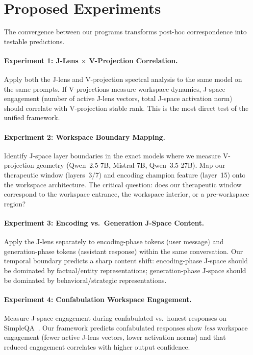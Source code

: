 \documentclass[11pt,a4paper]{article}
\begin{document}
\section{Proposed Experiments}
\label{sec:experiments}

The convergence between our programs transforms post-hoc correspondence
into testable predictions.

\paragraph{Experiment 1: J-Lens $\times$ V-Projection Correlation.}
Apply both the J-lens and V-projection spectral analysis to the same
model on the same prompts. If V-projections measure workspace dynamics,
J-space engagement (number of active J-lens vectors, total J-space
activation norm) should correlate with V-projection stable rank. This
is the most direct test of the unified framework.

\paragraph{Experiment 2: Workspace Boundary Mapping.}
Identify J-space layer boundaries in the exact models where we measure
V-projection geometry (Qwen~2.5-7B, Mistral-7B, Qwen~3.5-27B). Map our
therapeutic window (layers~3/7) and encoding champion feature (layer~15)
onto the workspace architecture. The critical question: does our
therapeutic window correspond to the workspace entrance, the workspace
interior, or a pre-workspace region?

\paragraph{Experiment 3: Encoding vs.\ Generation J-Space Content.}
Apply the J-lens separately to encoding-phase tokens (user message) and
generation-phase tokens (assistant response) within the same conversation.
Our temporal boundary predicts a sharp content shift: encoding-phase
J-space should be dominated by factual/entity representations;
generation-phase J-space should be dominated by behavioral/strategic
representations.

\paragraph{Experiment 4: Confabulation Workspace Engagement.}
Measure J-space engagement during confabulated vs.\ honest responses on
SimpleQA~\citep{wei2024simpleqa}. Our framework predicts confabulated
responses show \emph{less} workspace engagement (fewer active J-lens
vectors, lower activation norms) and that reduced engagement correlates
with higher output confidence.
\end{document}
